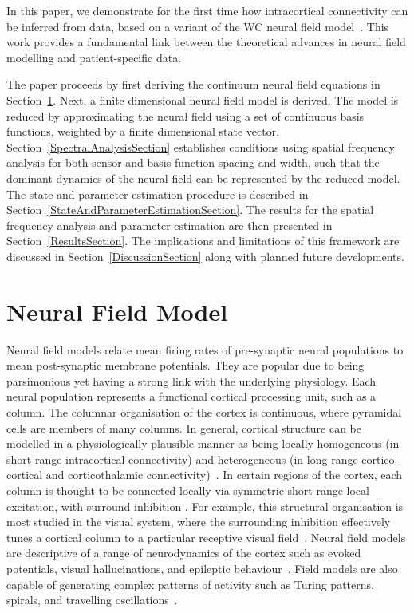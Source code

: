 \documentclass[10pt,a4paper]{article}
\begin{document}
In this paper, we demonstrate for the first time how intracortical connectivity can be inferred from data, based on a variant of the WC neural field model~\cite{Wilson1973}. This work provides a fundamental link between the theoretical advances in neural field modelling and patient-specific data.

The paper proceeds by first deriving the continuum neural field equations in Section~\ref{NeuralModelSection}. Next, a finite dimensional neural field model is derived. The model is reduced by approximating the neural field using a set of continuous basis functions, weighted by a finite dimensional state vector. Section~\ref{SpectralAnalysisSection} establishes conditions using spatial frequency analysis for both sensor and basis function spacing and width, such that the dominant dynamics of the neural field can be represented by the reduced model. The state and parameter estimation procedure is described in Section~\ref{StateAndParameterEstimationSection}. The results for the spatial frequency analysis and parameter estimation are then presented in Section~\ref{ResultsSection}. The implications and limitations of this framework are discussed in Section~\ref{DiscussionSection} along with planned future developments.

\section{Neural Field Model}\label{NeuralModelSection} 

Neural field models relate mean firing rates of pre-synaptic neural populations to mean post-synaptic membrane potentials. They are popular due to being parsimonious yet having a strong link with the underlying physiology. Each neural population represents a functional cortical processing unit, such as a column. The columnar organisation of the cortex is continuous, where pyramidal cells are members of many columns. In general, cortical structure can be modelled in a physiologically plausible manner as being locally homogeneous (in short range intracortical connectivity) and heterogeneous (in long range cortico-cortical and corticothalamic connectivity)~\cite{Jirsa2009,Qubbaj2007}. In certain regions of the cortex, each column is thought to be connected locally via symmetric short range local excitation, with surround inhibition \cite{Braitenberg1998}. For example, this structural organisation is most studied in the visual system, where the surrounding inhibition effectively tunes a cortical column to a particular receptive visual field~\cite{Sullivan2006}. Neural field models are descriptive of a range of neurodynamics of the cortex such as evoked potentials, visual hallucinations, and epileptic behaviour~\cite{David2003,Bressloff2001,Breakspear2006}. Field models are also capable of generating complex patterns of activity such as Turing patterns, spirals, and travelling oscillations~\cite{Amari1977,Coombes2005,Coombes2007}.
\end{document}

